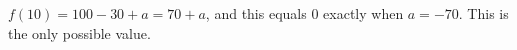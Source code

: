 $f(10)=100-30+a=70+a$, and this equals $0$ exactly when $a=\boxed{-70}$. This is the only possible value.

